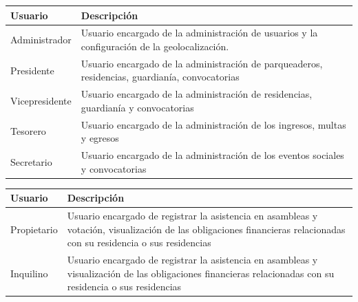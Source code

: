 \begin{table}[H]
    \centering
    \caption{Descripción de los usuarios identificados en la interacción con el sistema web administrativo}
    \renewcommand*{\arraystretch}{1.4}
    \begin{longtable}{|p{}|p{}|}
        \hline
        \textbf{Usuario} & \textbf{Descripción}                                                                           \\
        \hline
        Administrador    & Usuario encargado de la administración de usuarios y la configuración de la geolocalización.   \\
        \hline
        Presidente       & Usuario encargado de la administración de parqueaderos, residencias, guardianía, convocatorias \\
        \hline
        Vicepresidente   & Usuario encargado de la administración de residencias, guardianía y convocatorias              \\
        \hline
        Tesorero         & Usuario encargado de la administración de los ingresos, multas y egresos                       \\
        \hline
        Secretario       & Usuario encargado de la administración de los eventos sociales y convocatorias                 \\
        \hline
    \end{longtable}\label{tab:table_usuarios_web}
\end{table}

\begin{table}[H]
    \centering
    \caption{Descripción de los usuarios identificados en la interacción con la aplicación móvil}
    \renewcommand*{\arraystretch}{1.4}
    \begin{longtable}{|p{}|p{}|}
        \hline
        \textbf{Usuario} & \textbf{Descripción}                                                                                                                                                 \\
        \hline
        Propietario      & Usuario encargado de registrar la asistencia en asambleas y votación, visualización de las obligaciones financieras relacionadas con su residencia o sus residencias \\
        \hline
        Inquilino        & Usuario encargado de registrar la asistencia en asambleas y visualización de las obligaciones financieras relacionadas con su residencia o sus residencias           \\
        \hline
    \end{longtable}\label{tab:table_usuarios_movil}
\end{table}

